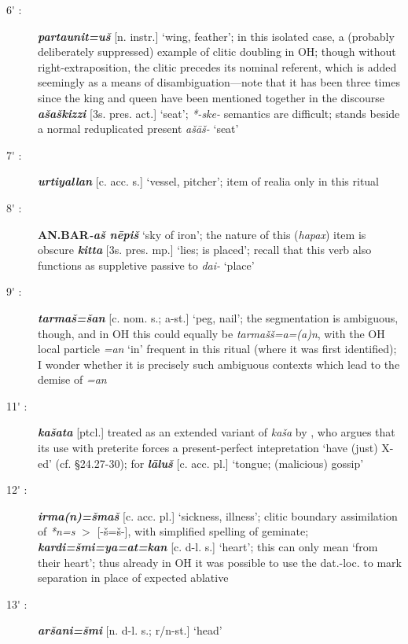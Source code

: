 \documentclass[10pt]{article}
\newcommand{\bit}[1]{\textbf{\textit{#1}}}				%
\newcommand{\p}[1]{{\tiny[{#1}]}}					%
\newcommand{\pr}{\'{ }}									%
\newcommand{\hith}{\textsubwedge{h}}
\renewcommand{\.}[1]{\textsubdot{#1}}
\begin{document}
\begin{description}
\item[6{\pr} :] \bit{partaunit=u\v{s}} \p{n. instr.} `wing, feather'; in this isolated case, a (probably deliberately suppressed) example of clitic doubling in OH; though without right-extraposition, the clitic precedes its nominal referent, which is added seemingly as a means of disambiguation---note that it has been three times since the king and queen have been mentioned together in the discourse  \bit{a\v{s}a\v{s}kizzi} \p{3s. pres. act.} `seat'; \textit{*-ske-} semantics are difficult; stands beside a normal reduplicated present \textit{a\v{s}\=a\v{s}-} `seat'

\item[7{\pr} :] \bit{{\hith}urtiyallan} \p{c. acc. s.} `vessel, pitcher'; item of realia only in this ritual

\item[8{\pr} :] \textbf{AN.BAR}\bit{-a\v{s} n\=epi\v{s}} `sky of iron'; the nature of this (\textit{hapax}) item is obscure 
\bit{kitta} \p{3s. pres. mp.} `lies; is placed'; recall that this verb also functions as suppletive passive to \textit{dai-} `place'

\item[9{\pr} :] \bit{tarma\v{s}=\v{s}an} \p{c. nom. s.; a-st.} `peg, nail'; the segmentation is ambiguous, though, and in OH this could equally be \textit{tarma\v{s}\v{s}=a=(a)n}, with the OH local particle \textit{=an} `in' frequent in this ritual (where it was first identified); I wonder whether it is precisely such ambiguous contexts which lead to the demise of \textit{=an} 

\item[11{\pr} :] \bit{ka\v{s}ata} \p{ptcl.} treated as an extended variant of \textit{ka\v{s}a} by \citet{hoffner1968review}, who argues that its use with preterite forces a present-perfect intepretation `have (just) X-ed' (cf.  \S24.27-30); for  \bit{l\=alu\v{s}} \p{c. acc. pl.} `tongue; (malicious) gossip'

\item[12{\pr} :] \bit{irma(n)=\v{s}ma\v{s}} \p{c. acc. pl.} `sickness, illness'; clitic boundary assimilation of \textit{*n=s} $>$ [-\v{s}=\v{s}-], with simplified spelling of geminate; \bit{kardi=\v{s}mi=ya=at=kan} \p{c. d-l. s.} `heart'; this can only mean `from their heart'; thus already in OH it was possible to use the dat.-loc. to mark separation in place of expected ablative

\item[13{\pr} :] \bit{{\hith}ar\v{s}ani=\v{s}mi} \p{n. d-l. s.; r/n-st.} `head'


\end{description}
\end{document}
